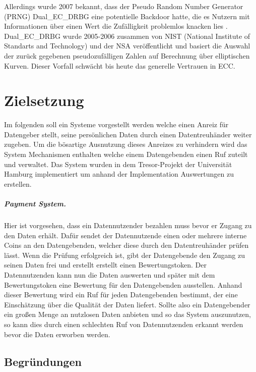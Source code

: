 \documentclass[11pt,a4paper]{scrreprt}
\begin{document}
Allerdings wurde 2007 bekannt, dass der Pseudo Random Number Generator (PRNG) Dual\_EC\_DRBG eine potentielle Backdoor hatte, die es Nutzern mit Informationen über einen Wert die Zufälligkeit problemlos knacken lies \cite{ecc-green2013backdoor}. Dual\_EC\_DRBG wurde 2005-2006 zusammen von NIST (National Institute of Standarts and Technology) und der NSA veröffentlicht und basiert die Auswahl der zurück gegebenen pseudozufälligen Zahlen auf Berechnung über elliptischen Kurven. Dieser Vorfall schwächt bis heute das generelle Vertrauen in ECC.

\cite{ecc-cloud2013elliptic}




\chapter{Zielsetzung}
Im folgenden soll ein Systeme vorgestellt werden welche einen Anreiz für Datengeber stellt, seine persönlichen Daten durch einen Datentreuhänder weiter zugeben. Um die bösartige Ausnutzung dieses Anreizes zu verhindern wird das System Mechanismen enthalten welche einem Datengebenden einen Ruf zuteilt und verwaltet. Das System wurden in dem Tresor-Projekt der Universität Hamburg implementiert um anhand der Implementation Auswertungen zu erstellen.

\paragraph{Payment System.}
Hier ist vorgesehen, dass ein Datennutzender bezahlen muss bevor er Zugang zu den Daten erhält. Dafür sendet der Datennutzende einen oder mehrere interne Coins an den Datengebenden, welcher diese durch den Datentreuhänder prüfen lässt. Wenn die Prüfung erfolgreich ist, gibt der Datengebende den Zugang zu seinen Daten frei und erstellt erstellt einen Bewertungstoken. Der Datennutzenden kann nun die Daten auswerten und später mit dem Bewertungstoken eine Bewertung für den Datengebenden ausstellen. Anhand dieser Bewertung wird ein Ruf für jeden Datengebenden bestimmt, der eine Einschätzung über die Qualität der Daten liefert. Sollte also ein Datengebender ein großen Menge an nutzlosen Daten anbieten und so das System auszunutzen, so kann dies durch einen schlechten Ruf von Datennutzenden erkannt werden bevor die Daten erworben werden.


\section{Begründungen}
\end{document}
